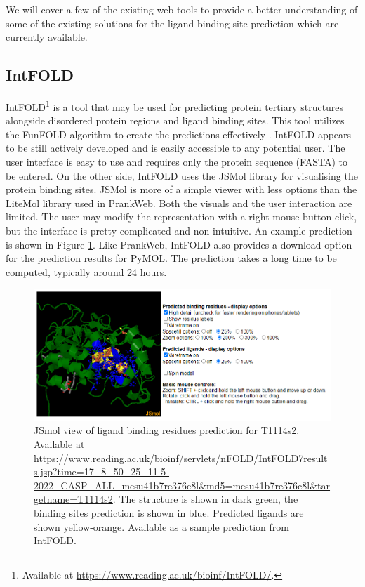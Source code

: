 We will cover a few of the existing web-tools to provide a better understanding of some of the existing solutions for the ligand binding site prediction which are currently available.

\subsection{IntFOLD}
\label{subsec:intfold}

IntFOLD\footnote{Available at \url{https://www.reading.ac.uk/bioinf/IntFOLD/}.} is a tool that may be used for predicting protein tertiary structures alongside disordered protein regions and ligand binding sites. This tool utilizes the FunFOLD algorithm to create the predictions effectively \cite{10.1093/nar/gkz322}. IntFOLD appears to be still actively developed and is easily accessible to any potential user. The user interface is easy to use and requires only the protein sequence (FASTA) to be entered. On the other side, IntFOLD uses the JSMol library for visualising the protein binding sites. JSMol is more of a simple viewer with less options than the LiteMol library used in PrankWeb. Both the visuals and the user interaction are limited. The user may modify the representation with a right mouse button click, but the interface is pretty complicated and non-intuitive. An example prediction is shown in Figure \ref{fig:intfold_prediction}. Like PrankWeb, IntFOLD also provides a download option for the prediction results for PyMOL. The prediction takes a long time to be computed, typically around 24 hours.

\begin{figure}
    \centering
    \includegraphics[width=\linewidth]{img/intfold_prediction.png}
    \caption{JSmol view of ligand binding residues prediction for T1114s2.
    Available at \url{https://www.reading.ac.uk/bioinf/servlets/nFOLD/IntFOLD7results.jsp?time=17_8_50_25_11-5-2022_CASP_ALL_mesu41b7re376c8l&md5=mesu41b7re376c8l&targetname=T1114s2}. The structure is shown in dark green, the binding sites prediction is shown in blue. Predicted ligands are shown yellow-orange. Available as a sample prediction from IntFOLD.}
    \label{fig:intfold_prediction}
\end{figure}

